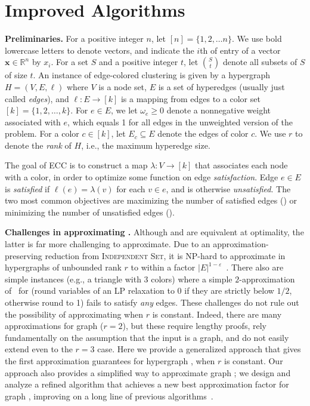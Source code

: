 \section{Improved \maxecc{} Algorithms}
\textbf{Preliminaries.} For a positive integer $n$, let $[n] = \{1,2, \hdots n\}$.
We use bold lowercase letters to denote vectors, and indicate the $i$th of entry of a vector $\textbf{x} \in \mathbb{R}^n$ by $x_i$. For a set $S$ and a positive integer $t$, let $\binom{S}{t}$ denote all subsets of $S$ of size $t$.
An instance of edge-colored clustering is given by a hypergraph $H = (V,E, \ell)$ where $V$ is a node set, $E$ is a set of hyperedges (usually just called \emph{edges}), and $\ell \colon E \rightarrow [k]$ is a mapping from edges to a color set $[k] = \{1,2, \hdots, k\}$.  For $e \in E$, we let $\omega_e \geq 0 $ denote a nonnegative weight associated with $e$, which equals 1 for all edges in the unweighted version of the problem. For a color $c \in [k]$, let $E_c \subseteq E$ denote the edges of color $c$. We use $r$ to denote the \emph{rank} of $H$, i.e., the maximum hyperedge size.

The goal of ECC is to construct a map $\lambda \colon V \rightarrow [k]$ that associates each node with a color, in order to optimize some function on edge \emph{satisfaction}. Edge $e \in E$ is \emph{satisfied} if $\ell(e) = \lambda(v)$ for each $v \in e$, and is otherwise \emph{unsatisfied}. The two most common objectives are maximizing the number of satisfied edges (\maxecc{}) or minimizing the number of unsatisfied edges (\minecc{}).

\textbf{Challenges in approximating \maxecc{}.} Although \minecc{} and \maxecc{} are equivalent at optimality, the latter is far more challenging to approximate. Due to an approximation-preserving reduction from \textsc{Independent Set}, it is NP-hard
to approximate \maxecc{} in hypergraphs of unbounded rank $r$ to within a factor $|E|^{1-\varepsilon}$~\cite{veldt2023optimal,zuckerman2006linear}. There also are simple instances (e.g., a triangle with 3 colors) where a simple $2$-approximation of~\citet{amburg2020clustering} for \minecc{} (round variables of an LP relaxation to 0 if they are strictly below $1/2$, otherwise round to 1) fails to satisfy \emph{any} edges.
These challenges do not rule out the possibility of approximating \maxecc{} when $r$ is constant. Indeed, there are many approximations for graph \maxecc{} ($r=2$), but these require lengthy proofs, rely fundamentally on the assumption that the input is a graph, and do not easily extend even to the $r = 3$ case. Here we provide a generalized approach that gives the first approximation guarantees for hypergraph \maxecc{}, when $r$ is constant. Our approach also provides a simplified way to approximate graph \maxecc{}; we design and analyze a refined algorithm that achieves a new best approximation factor for graph \maxecc{}, improving on a long line of previous algorithms~\cite{angel2016clustering,alhamdan2019approximability,ageev2015improved,ageev20200}.

